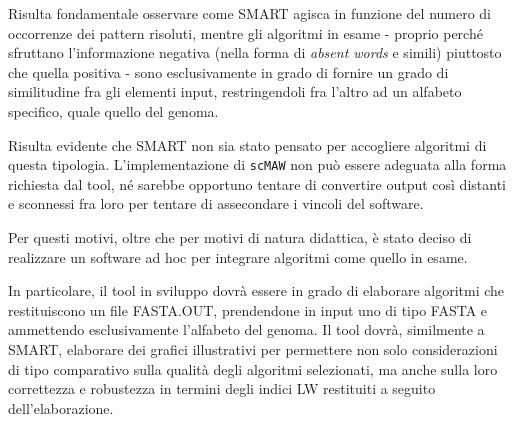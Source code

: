 Risulta fondamentale osservare come SMART agisca in funzione del numero di occorrenze dei pattern risoluti, mentre gli algoritmi in esame - proprio perché sfruttano l'informazione negativa (nella forma di \textit{absent words} e  simili) piuttosto che quella positiva - sono esclusivamente in grado di fornire un grado di similitudine fra gli elementi input, restringendoli fra l'altro ad un alfabeto specifico, quale quello del genoma. 

Risulta evidente che SMART non sia stato pensato per accogliere algoritmi di questa tipologia. L'implementazione di \verb|scMAW| non può essere adeguata alla forma richiesta dal tool, né sarebbe opportuno tentare di convertire output così distanti e sconnessi fra loro per tentare di assecondare i vincoli del software. 

\vspace{3mm}

Per questi motivi, oltre che per motivi di natura didattica, è stato deciso di realizzare un software ad hoc per integrare algoritmi come quello in esame. 

\vspace{3mm}

In particolare, il tool in sviluppo dovrà essere in grado di elaborare algoritmi che restituiscono un file FASTA.OUT, prendendone in input uno di tipo FASTA e ammettendo esclusivamente l'alfabeto del genoma. Il tool dovrà, similmente a SMART, elaborare dei grafici illustrativi per permettere non solo considerazioni di tipo comparativo sulla qualità degli algoritmi selezionati, ma anche sulla loro correttezza e robustezza in termini degli indici LW restituiti a seguito dell'elaborazione.